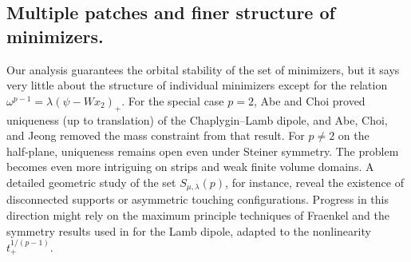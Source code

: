 \documentclass[11pt,letterpaper]{amsart}
\theoremstyle{definition}
\theoremstyle{remark}
\numberwithin{equation}{section}
\begin{document}
\subsection{Multiple patches and finer structure of minimizers.}

Our analysis guarantees the orbital stability of the set of minimizers, but it says very little about the structure of individual minimizers except for the relation $\omega^{p-1} = \lambda(\psi - W x_2)_+$. For the special case $p=2$, Abe and Choi \cite{abe2022stability} proved uniqueness (up to translation) of the Chaplygin–Lamb dipole, and Abe, Choi, and Jeong \cite{Abe2025StabilityOL} removed the mass constraint from that result. For $p \neq 2$ on the half‑plane, uniqueness remains open even under Steiner symmetry. The problem becomes even more intriguing on strips and weak finite volume domains. A detailed geometric study of the set $S_{\mu,\lambda}(p)$, for instance, reveal the existence of disconnected supports or asymmetric touching configurations. Progress in this direction might rely on the maximum principle techniques of Fraenkel \cite{fraenkel2000introduction} and the symmetry results used in \cite{abe2022stability} for the Lamb dipole, adapted to the nonlinearity $t^{1/(p-1)}_+$.



\end{document}
